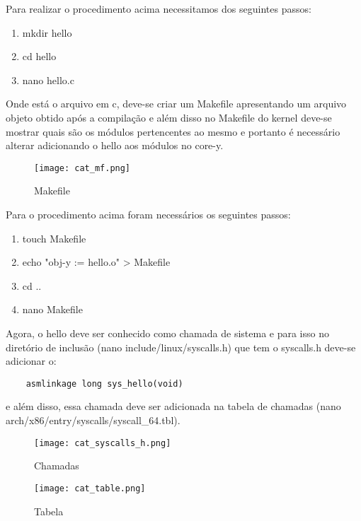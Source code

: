 \documentclass[a4paper, 12pt]{article}
\begin{document}
Para realizar o procedimento acima necessitamos dos seguintes passos:

\begin{enumerate}
    \item mkdir hello
    \item cd hello
    \item nano hello.c
\end{enumerate}

Onde está o arquivo em c, deve-se criar um Makefile apresentando um arquivo objeto obtido após a compilação e além disso no Makefile do kernel deve-se mostrar quais são os módulos pertencentes ao mesmo e portanto é necessário alterar adicionando o hello aos módulos no core-y.

\begin{figure}[!htb]
\centering 
\texttt{[image: cat\_mf.png]}
\label{figura:qualquernome}
\caption{Makefile}
\end{figure}

Para o procedimento acima foram necessários os seguintes passos:

\begin{enumerate}
    \item touch Makefile
    \item echo "obj-y := hello.o" > Makefile
    \item cd ..
    \item nano Makefile
\end{enumerate}

Agora, o hello deve ser conhecido como chamada de sistema e para isso no diretório de inclusão (nano include/linux/syscalls.h) que tem o syscalls.h deve-se adicionar o:
\begin{lstlisting} 
    asmlinkage long sys_hello(void) 
\end{lstlisting}  
e além disso, essa chamada deve ser adicionada na tabela de chamadas (nano arch/x86/entry/syscalls/syscall_64.tbl).

\newpage 

\begin{figure}[!h]
\centering 
\texttt{[image: cat\_syscalls\_h.png]}
\label{figura:qualquernome}
\caption{Chamadas}
\end{figure}

\begin{figure}[!h]
\centering 
\texttt{[image: cat\_table.png]}
\label{figura:qualquernome}
\caption{Tabela}
\end{figure}
\end{document}
